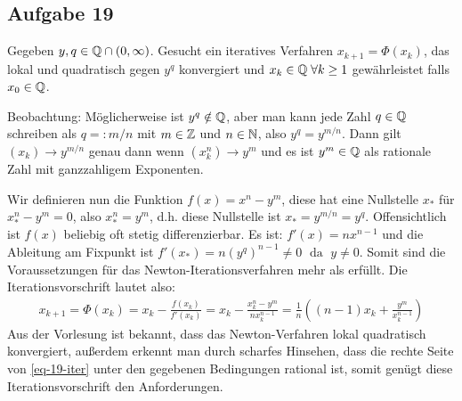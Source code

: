 \subsection*{Aufgabe 19}

Gegeben $y, q \in \mathbb Q \cap (0, \infty)$. Gesucht ein iteratives Verfahren $x_{k + 1} = \Phi (x_k)$,
das lokal und quadratisch gegen $y^q$ konvergiert und $x_k \in \mathbb Q \; \forall k \ge 1$
gewährleistet falls $x_0 \in \mathbb Q$.

Beobachtung: Möglicherweise ist $y^q \notin \mathbb Q$, aber man kann jede Zahl
$q \in \mathbb Q$ schreiben als $q =: m /n$ mit $m \in \mathbb Z$ und $n \in \mathbb N$,
also $y^q = y^{m/n}$. Dann gilt $(x_k) \rightarrow y^{m/n}$ genau dann wenn
$\left(x_k^n\right)\rightarrow y^m$ und es ist $y^m \in \mathbb Q$ als rationale Zahl
mit ganzzahligem Exponenten.

Wir definieren nun die Funktion $f(x) = x^n - y^m$, diese hat eine Nullstelle $x_*$
für $x_*^n - y^m = 0$, also  $x_*^n = y^m$, d.h. diese Nullstelle ist
$x_* = y^{m/n}= y^q$. Offensichtlich ist $f(x)$ beliebig oft
stetig differenzierbar. Es ist: $f'(x) = n x^{n - 1}$ und die Ableitung
am Fixpunkt ist $f'(x_*) =  n (y^q)^{n-1} \ne 0 \; \text{ da } \; y \ne 0$.
Somit sind die Voraussetzungen für das Newton-Iterationsverfahren mehr als erfüllt.
Die Iterationsvorschrift lautet also:
\begin{align}
  \label{eq-19-iter}
  x_{k+1} =  \Phi (x_k)
  = x_k - \frac{f(x_k)}{f'(x_k)} = x_k - \frac{x_k^n - y^m}{n x_k^{n-1}}
  = \frac{1}{n} \left((n -1)x_k + \frac{y^m}{x_k^{n-1}} \right)
\end{align}
Aus der Vorlesung ist bekannt, dass das Newton-Verfahren lokal quadratisch
konvergiert, außerdem erkennt man durch scharfes Hinsehen, dass die rechte Seite
von \eqref{eq-19-iter} unter den gegebenen Bedingungen rational ist, somit
genügt diese Iterationsvorschrift den Anforderungen.
